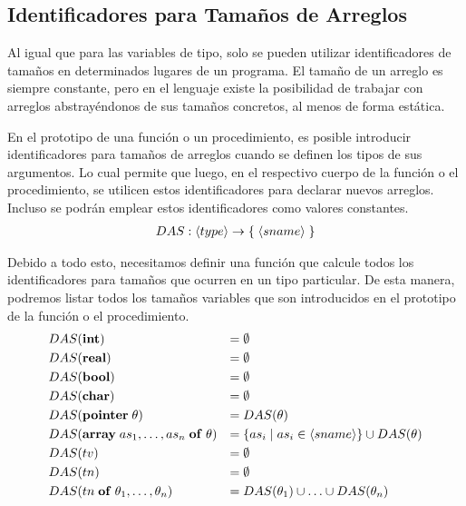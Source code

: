 \subsection{Identificadores para Tamaños de Arreglos}

Al igual que para las variables de tipo, solo se pueden utilizar identificadores de tamaños en determinados lugares de un programa.
El tamaño de un arreglo es siempre constante, pero en el lenguaje existe la posibilidad de trabajar con arreglos abstrayéndonos de sus tamaños concretos, al menos de forma estática.

En el prototipo de una función o un procedimiento, es posible introducir identificadores para tamaños de arreglos cuando se definen los tipos de sus argumentos.
Lo cual permite que luego, en el respectivo cuerpo de la función o el procedimiento, se utilicen estos identificadores para declarar nuevos arreglos.
Incluso se podrán emplear estos identificadores como valores constantes.
\begin{gather*}
DAS: \langle type \rangle \rightarrow \{ \; \langle sname \rangle \; \}
\end{gather*}

Debido a todo esto, necesitamos definir una función que calcule todos los identificadores para tamaños que ocurren en un tipo particular.
De esta manera, podremos listar todos los tamaños variables que son introducidos en el prototipo de la función o el procedimiento.
\begin{align*}
&DAS(\mathbf{int})
&=&\;
\emptyset
\\
&DAS(\mathbf{real})
&=&\;
\emptyset
\\
&DAS(\mathbf{bool})
&=&\;
\emptyset
\\
&DAS(\mathbf{char})
&=&\;
\emptyset
\\
&DAS(\mathbf{pointer} \; \theta)
&=&\;
DAS(\theta)
\\
&DAS(\mathbf{array} \; as_1, \ldots, as_n \; \mathbf{of} \; \theta)
&=&\;
\{ as_i \mid as_i \in \langle sname \rangle \} \cup DAS(\theta)
\\
&DAS(tv)
&=&\;
\emptyset
\\
&DAS(tn)
&=&\;
\emptyset
\\
&DAS(tn \; \mathbf{of} \; \theta_1, \ldots, \theta_n)
&=&\;
DAS(\theta_1) \cup \ldots \cup DAS(\theta_n)
\end{align*}

